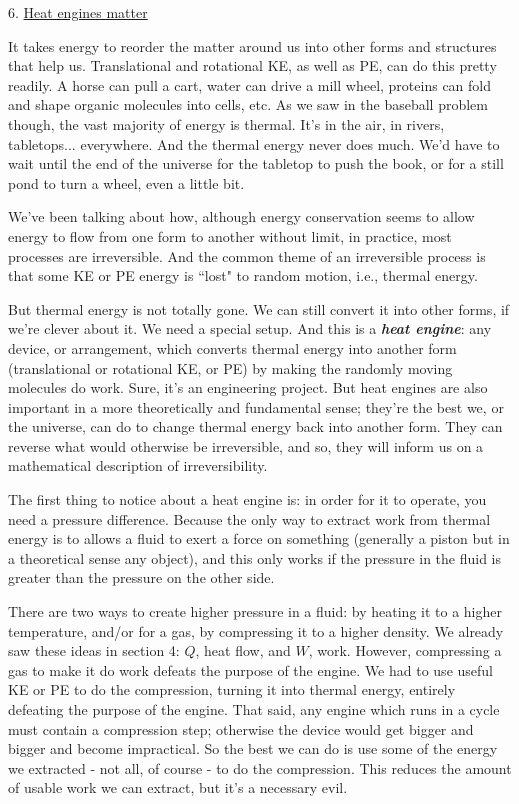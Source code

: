 \documentclass[12pt]{article}
\begin{document}
6. \underline{Heat engines matter}

It takes energy to reorder the matter around us into other forms and structures that help us. Translational and rotational KE, as well as PE, can do this pretty readily. A horse can pull a cart, water can drive a mill wheel, proteins can fold and shape organic molecules into cells, etc. As we saw in the baseball problem though, the vast majority of energy is thermal. It's in the air, in rivers, tabletops... everywhere. And the thermal energy never does much. We'd have to wait until the end of the universe for the tabletop to push the book, or for a still pond to turn a wheel, even a little bit.

We've been talking about how, although energy conservation seems to allow energy to flow from one form to another without limit, in practice, most processes are irreversible. And the common theme of an irreversible process is that some KE or PE energy is ``lost" to random motion, i.e., thermal energy.  

But thermal energy is not totally gone. We can still convert it into other forms, if we're clever about it. We need a special setup. And this is a \textbf{\textit{heat engine}}: any device, or arrangement, which converts thermal energy into another form (translational or rotational KE, or PE) by making the randomly moving molecules do work. Sure, it's an engineering project. But heat engines are also important in a more theoretically and fundamental sense; they're the best we, or the universe, can do to change thermal energy back into another form. They can reverse what would otherwise be irreversible, and so, they will inform us on a mathematical description of irreversibility. 

The first thing to notice about a heat engine is: in order for it to operate, you need a pressure difference. Because the only way to extract work from thermal energy is to allows a fluid to exert a force on something (generally a piston but in a theoretical sense any object), and this only works if the pressure in the fluid is greater than the pressure on the other side.

There are two ways to create higher pressure in a fluid: by heating it to a higher temperature, and/or for a gas, by compressing it to a higher density. We already saw these ideas in section 4: $Q$, heat flow, and $W$, work. However, compressing a gas to make it do work defeats the purpose of the engine. We had to use useful KE or PE to do the compression, turning it into thermal energy, entirely defeating the purpose of the engine. That said, any engine which runs in a cycle must contain a compression step; otherwise the device would get bigger and bigger and become impractical. So the best we can do is use some of the energy we extracted - not all, of course - to do the compression. This reduces the amount of usable work we can extract, but it's a necessary evil. 
\end{document}
